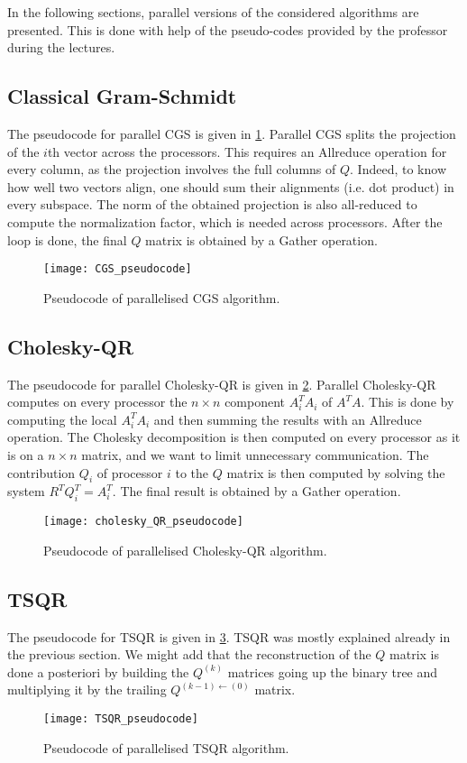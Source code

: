 \documentclass[a4paper, 12pt,oneside]{article}
\begin{document}
		In the following sections, parallel versions of the considered algorithms are presented. This is done with help of the pseudo-codes provided by the professor during the lectures.
		\subsection{Classical Gram-Schmidt}
			The pseudocode for parallel CGS is given in \ref{fig:CGS-pseudocode}.   
			Parallel CGS splits the projection of the $i$th vector across the processors. This requires an Allreduce operation for every column, as the projection involves the full columns of $Q$. Indeed, to know how well two vectors align, one should sum their alignments (i.e. dot product) in every subspace. The norm of the obtained projection is also all-reduced to compute the normalization factor, which is needed across processors. After the loop is done, the final $Q$ matrix is obtained by a Gather operation.
			\begin{figure}[htb]       
				\centering             
					\vspace{0em}
					\texttt{[image: CGS\_pseudocode]}
					\caption{Pseudocode of parallelised CGS algorithm.}
					\label{fig:CGS-pseudocode}
			\end{figure}
		\subsection{Cholesky-QR}
			The pseudocode for parallel Cholesky-QR is given in \ref{fig:Cholesky-QR-pseudocode}.
			Parallel Cholesky-QR computes on every processor the $n\times n$ component $A_i^TA_i$ of $A^TA$. This is done by computing the local $A_i^TA_i$ and then summing the results with an Allreduce operation. The Cholesky decomposition is then computed on every processor as it is on a $n\times n$ matrix, and we want to limit unnecessary communication. The contribution $Q_i$ of processor $i$ to the $Q$ matrix is then computed by solving the system $R^TQ_i^T=A_i^T$. The final result is obtained by a Gather operation. 
			\begin{figure}
				\centering
				\texttt{[image: cholesky\_QR\_pseudocode]}
				\caption{Pseudocode of parallelised Cholesky-QR algorithm.}
				\label{fig:Cholesky-QR-pseudocode}
			\end{figure}
		\subsection{TSQR}
			The pseudocode for TSQR is given in \ref{fig:TSQR-pseudocode}.
			TSQR was mostly explained already in the previous section. We might add that the reconstruction of the $Q$ matrix is done a posteriori by building the $Q^{(k)}$ matrices going up the binary tree and multiplying it by the trailing $Q^{(k-1)\leftarrow(0)}$ matrix. 
			\begin{figure}
				\centering
				\texttt{[image: TSQR\_pseudocode]}
				\caption{Pseudocode of parallelised TSQR algorithm.}
				\label{fig:TSQR-pseudocode}
			\end{figure}
	
\end{document}
